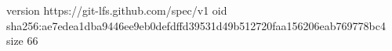 version https://git-lfs.github.com/spec/v1
oid sha256:ae7edea1dba9446ee9eb0defdffd39531d49b512720faa156206eab769778bc4
size 66
